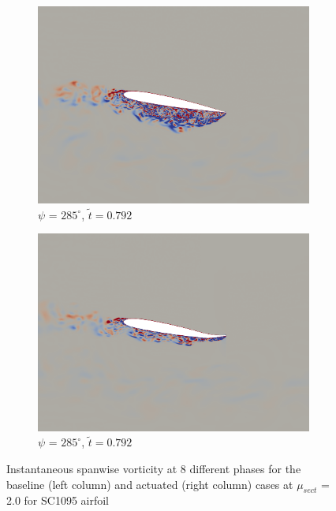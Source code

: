 \begin{figure}[H]
	\begin{subfigure}[b]{0.4\textwidth}
		\centering
		\includegraphics[width=1\textwidth]{figures/SC1095/baseline/phase_285.png}
		\caption{ $\psi$ = $285^\circ$, $\tilde{t}=0.792$}
		\label{fig:SC1095_baseline_psi285}
	\end{subfigure}
	\begin{subfigure}[b]{0.4\textwidth}
		\centering
		\includegraphics[width=1\textwidth]{figures/SC1095/AC/phase_285.png}
		\caption{ $\psi$ = $285^\circ$,  $\tilde{t}=0.792$}
		\label{fig:SC1095_AC_psi285}
	\end{subfigure}
	
		\caption{Instantaneous spanwise vorticity at 8 different phases for the baseline (left column) and actuated (right column) cases at $\mu_{sect}$ = 2.0 for SC1095 airfoil}
\end{figure}

